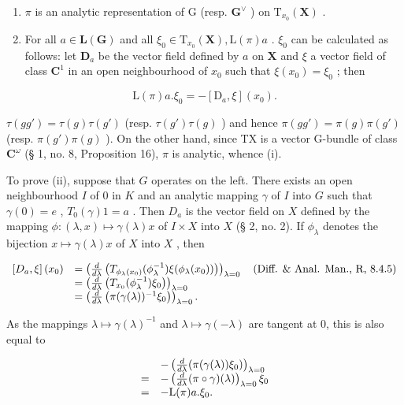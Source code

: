 \begin{enumerate}
\def\labelenumi{(\roman{enumi})}
\item
  \(\pi\) is an analytic representation of G (resp. \(\mathbf{G}^{\vee}\) ) on \(\mathrm{T}_{x_0}(\mathbf{X})\) .
\item
  For all \(a \in \mathbf{L}(\mathbf{G})\) and all \(\xi_0 \in \mathrm{T}_{x_0}(\mathbf{X}), \mathrm{L}(\pi)a\) . \(\xi_0\) can be calculated as follows: let \(\mathbf{D}_a\) be the vector field defined by \(a\) on \(\mathbf{X}\) and \(\xi\) a vector field of class \(\mathbf{C}^1\) in an open neighbourhood of \(x_0\) such that \(\xi(x_0) = \xi_0\) ; then
\end{enumerate}

\[
\mathrm{L} (\pi) a. \xi_ {0} = - [ \mathrm{D} _ {a}, \xi ] (x _ {0}).
\]

\(\tau(gg') = \tau(g)\tau(g')\) (resp. \(\tau(g')\tau(g)\) ) and hence \(\pi(gg') = \pi(g)\pi(g')\) (resp. \(\pi(g')\pi(g)\) ). On the other hand, since TX is a vector G-bundle of class \(\mathbf{C}^{\omega}\) (§ 1, no. 8, Proposition 16), \(\pi\) is analytic, whence (i).

To prove (ii), suppose that \(G\) operates on the left. There exists an open neighbourhood \(I\) of \(0\) in \(K\) and an analytic mapping \(\gamma\) of \(I\) into \(G\) such that \(\gamma(0) = e\) , \(T_0(\gamma)1 = a\) . Then \(D_a\) is the vector field on \(X\) defined by the mapping \(\phi: (\lambda, x) \mapsto \gamma(\lambda)x\) of \(I \times X\) into \(X\) (§ 2, no. 2). If \(\phi_{\lambda}\) denotes the bijection \(x \mapsto \gamma(\lambda)x\) of \(X\) into \(X\) , then

\[
\begin{array}{r l} \left[ D _ {a}, \xi \right] (x _ {0}) & = \left(\frac {d}{d \lambda} \left(T _ {\phi_ {\lambda} (x _ {0})} (\phi_ {\lambda} ^ {- 1}) \xi (\phi_ {\lambda} (x _ {0}))\right)\right) _ {\lambda = 0} \quad \text {(Diff. \& Anal. Man., R, 8.4.5)} \\ & = \left(\frac {d}{d \lambda} \left(T _ {x _ {0}} (\phi_ {\lambda} ^ {- 1}) \xi_ {0}\right)\right) _ {\lambda = 0} \\ & = \left(\frac {d}{d \lambda} \left(\pi (\gamma (\lambda)) ^ {- 1} \xi_ {0}\right)\right) _ {\lambda = 0}. \end{array}
\]

As the mappings \(\lambda \mapsto \gamma (\lambda)^{-1}\) and \(\lambda \mapsto \gamma (-\lambda)\) are tangent at 0, this is also equal to

\[
\begin{array}{r l} & {- \left(\frac {d}{d \lambda} (\pi (\gamma (\lambda)) \xi_ {0})\right) _ {\lambda = 0}} \\ {=} & {- \left(\frac {d}{d \lambda} (\pi \circ \gamma) (\lambda)\right) _ {\lambda = 0} \xi_ {0}} \\ {=} & {- \mathrm{L} (\pi) a. \xi_ {0}.} \end{array}
\]
\relax{}
